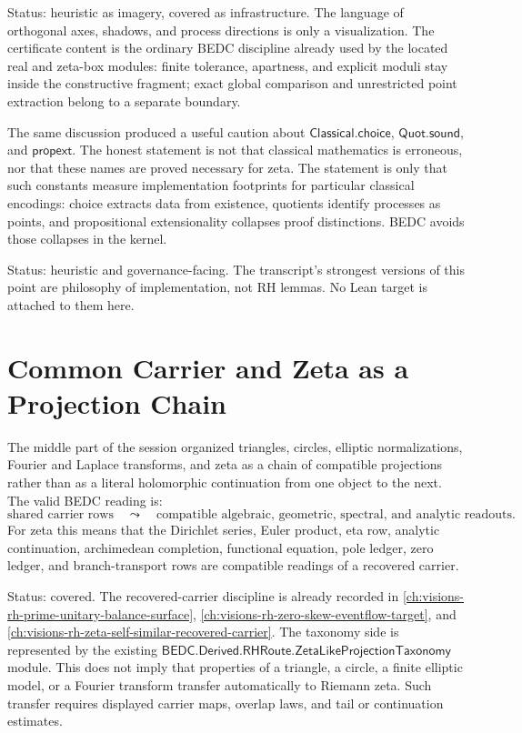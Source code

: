 Status: heuristic as imagery, covered as infrastructure.  The language of
orthogonal axes, shadows, and process directions is only a visualization.
The certificate content is the ordinary BEDC discipline already used by the
located real and zeta-box modules: finite tolerance, apartness, and explicit
moduli stay inside the constructive fragment; exact global comparison and
unrestricted point extraction belong to a separate boundary.

The same discussion produced a useful caution about
$\mathsf{Classical.choice}$, $\mathsf{Quot.sound}$, and
$\mathsf{propext}$.  The honest statement is not that classical mathematics
is erroneous, nor that these names are proved necessary for zeta.  The
statement is only that such constants measure implementation footprints for
particular classical encodings: choice extracts data from existence,
quotients identify processes as points, and propositional extensionality
collapses proof distinctions.  BEDC avoids those collapses in the kernel.

Status: heuristic and governance-facing.  The transcript's strongest
versions of this point are philosophy of implementation, not RH lemmas.  No
Lean target is attached to them here.

\section{Common Carrier and Zeta as a Projection Chain}
\label{sec:rh-ledger-common-carrier-projection-chain}

The middle part of the session organized triangles, circles, elliptic
normalizations, Fourier and Laplace transforms, and zeta as a chain of
compatible projections rather than as a literal holomorphic continuation
from one object to the next.  The valid BEDC reading is:
$$
\text{shared carrier rows}
\quad\leadsto\quad
\text{compatible algebraic, geometric, spectral, and analytic readouts}.
$$
For zeta this means that the Dirichlet series, Euler product, eta row,
analytic continuation, archimedean completion, functional equation, pole
ledger, zero ledger, and branch-transport rows are compatible readings of a
recovered carrier.

Status: covered.  The recovered-carrier discipline is already recorded in
\autoref{ch:visions-rh-prime-unitary-balance-surface},
\autoref{ch:visions-rh-zero-skew-eventflow-target}, and
\autoref{ch:visions-rh-zeta-self-similar-recovered-carrier}.  The taxonomy
side is represented by the existing
$\mathsf{BEDC.Derived.RHRoute.ZetaLikeProjectionTaxonomy}$ module.  This
does not imply that properties of a triangle, a circle, a finite elliptic
model, or a Fourier transform transfer automatically to Riemann zeta.  Such
transfer requires displayed carrier maps, overlap laws, and tail or
continuation estimates.

